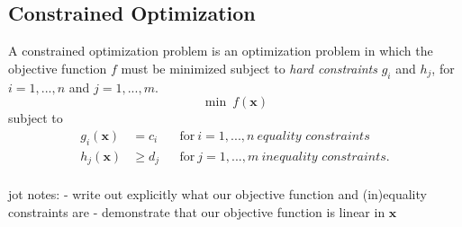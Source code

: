 \documentclass[../mthe-493-final-project.tex]{subfiles}
\begin{document}
    \subsection{Constrained Optimization}
    \label{ssec:constrained-optimization}

    A constrained optimization problem is an optimization problem in which the objective function $f$ must be minimized subject to \textit{hard constraints} $g_i$ and $h_j$, for $i=1,...,n$ and $j=1,...,m$.
    \[ \min \ f(\mathbf{x}) \]
    subject to
    \begin{align*}
        g_i(\mathbf{x}) &= c_i    & &\text{for} \ i = 1,...,n \ \textit{equality constraints}    \\
        h_j(\mathbf{x}) &\geq d_j & &\text{for} \ j = 1,...,m \ \textit{inequality constraints}. \\
    \end{align*}

    jot notes:
    - write out explicitly what our objective function and (in)equality constraints are
    - demonstrate that our objective function is linear in $\mathbf{x}$
\end{document}
